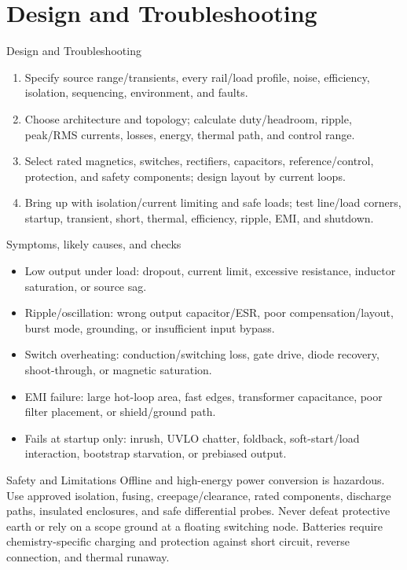 \documentclass[10pt,letterpaper]{article}
\begin{document}
\section{Design and Troubleshooting}
\begin{CornellExamBox}{Design and Troubleshooting}
\begin{enumerate}
  \item Specify source range/transients, every rail/load profile, noise, efficiency, isolation, sequencing, environment, and faults.
  \item Choose architecture and topology; calculate duty/headroom, ripple, peak/RMS currents, losses, energy, thermal path, and control range.
  \item Select rated magnetics, switches, rectifiers, capacitors, reference/control, protection, and safety components; design layout by current loops.
  \item Bring up with isolation/current limiting and safe loads; test line/load corners, startup, transient, short, thermal, efficiency, ripple, EMI, and shutdown.
\end{enumerate}\end{CornellExamBox}
\begin{CornellExamBox}{Symptoms, likely causes, and checks}
\begin{itemize}
  \item Low output under load: dropout, current limit, excessive resistance, inductor saturation, or source sag.
  \item Ripple/oscillation: wrong output capacitor/ESR, poor compensation/layout, burst mode, grounding, or insufficient input bypass.
  \item Switch overheating: conduction/switching loss, gate drive, diode recovery, shoot-through, or magnetic saturation.
  \item EMI failure: large hot-loop area, fast edges, transformer capacitance, poor filter placement, or shield/ground path.
  \item Fails at startup only: inrush, UVLO chatter, foldback, soft-start/load interaction, bootstrap starvation, or prebiased output.
\end{itemize}\end{CornellExamBox}
\begin{CornellWarningBox}{Safety and Limitations}
Offline and high-energy power conversion is hazardous. Use approved isolation, fusing, creepage/clearance, rated components, discharge paths, insulated enclosures, and safe differential probes. Never defeat protective earth or rely on a scope ground at a floating switching node. Batteries require chemistry-specific charging and protection against short circuit, reverse connection, and thermal runaway.
\end{CornellWarningBox}
\end{document}
